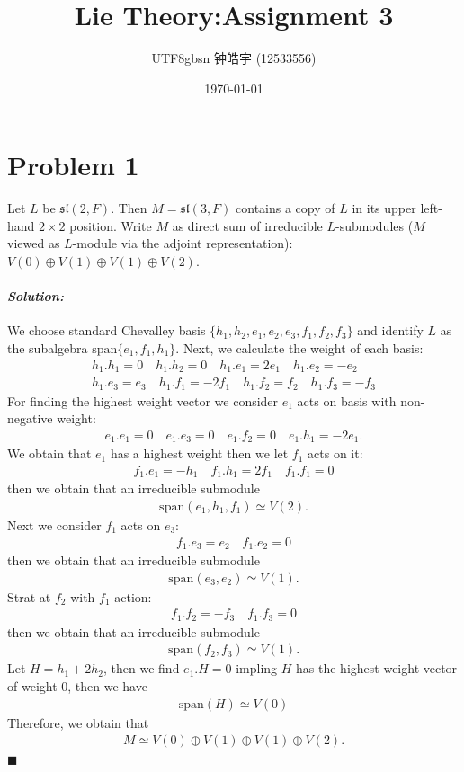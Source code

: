 \documentclass[12pt, a4paper]{article}
\title{Lie Theory:Assignment 3}
\author{
    \begin{CJK*}{UTF8}{gbsn}
    钟皓宇 (12533556)
    \end{CJK*}
}
\date{\today}
\newenvironment{solution}
  {\paragraph{\textit{Solution:}}\par\medskip}
  {\hfill$\blacksquare$\vspace{0.1cm}}
\begin{document}
\maketitle

\section*{Problem 1}
Let $L$ be $\mathfrak{sl}(2, F)$. Then 
$M = \mathfrak{sl}(3, F)$ contains a copy of $L$ in its upper left-hand $2 \times 2$ position. Write $M$ as direct sum of irreducible $L$-submodules ($M$ viewed as $L$-module via the adjoint representation): $V(0) \oplus V(1) \oplus V(1) \oplus V(2)$.
\begin{solution}
We choose standard Chevalley basis $\{h_1, h_2, e_1, e_2, e_3, f_1, f_2, f_3\}$ and identify $L$ as the subalgebra $\text{span}\{e_1, f_1, h_1\}$. 
Next, we calculate the weight of each basis:
\begin{align*}
  h_1.h_1 = 0 \quad h_1.h_2=0\quad h_1.e_1=2e_1 \quad h_1.e_2=-e_2\\ h_1.e_3= e_3 \quad h_1.f_1=-2f_1
  \quad h_1.f_2=f_2 \quad h_1.f_3=-f_3
\end{align*}
For finding the highest weight vector we consider $e_1$ acts on basis with non-negative weight:
\begin{align*}
  e_1.e_1 = 0 \quad e_1.e_3= 0 \quad e_1.f_2 = 0 \quad e_1.h_1 = -2e_1.
\end{align*}
We obtain that $e_1$ has a highest weight then we let $f_1$ acts on it:
\begin{align*}
  f_1.e_1 = -h_1 \quad f_1.h_1 = 2f_1\quad f_1.f_1 = 0
\end{align*}
then we obtain that an irreducible submodule
\begin{align*}
  \text{span}(e_1,h_1,f_1)\simeq V(2).
\end{align*}
Next we consider $f_1$ acts on $e_3$:
\begin{align*}
  f_1.e_3 = e_2\quad f_1.e_2 = 0
\end{align*}
then we obtain that an irreducible submodule
\begin{align*}
  \text{span}(e_3,e_2)\simeq V(1).
\end{align*}
Strat at $f_2$ with $f_1$ action:
\begin{align*}
  f_1.f_2 = -f_3 \quad f_1.f_3 = 0
\end{align*} 
then we obtain that an irreducible submodule
\begin{align*}
  \text{span}(f_2,f_3)\simeq V(1).
\end{align*}
Let $H=h_1+2h_2$, then we find $e_1.H = 0$ impling $H$ has the highest weight vector of weight 0, then we have 
\begin{align*}
  \text{span}(H)\simeq V(0)
\end{align*}
Therefore, we obtain that 
\begin{align*}
  M\simeq V(0) \oplus V(1) \oplus V(1) \oplus V(2).
\end{align*}
\end{solution}
\end{document}
